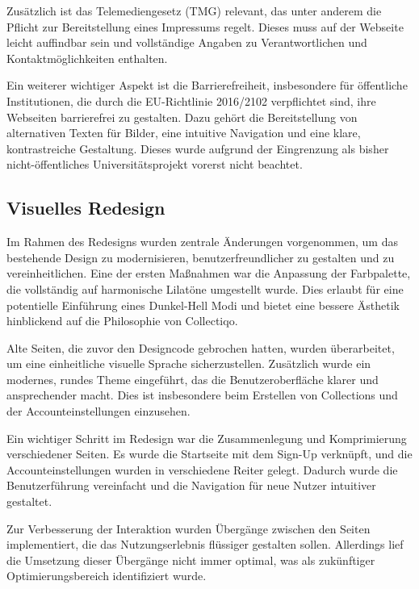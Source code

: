 Zusätzlich ist das Telemediengesetz (TMG) relevant, das unter anderem die Pflicht zur Bereitstellung eines Impressums regelt.
Dieses muss auf der Webseite leicht auffindbar sein und vollständige Angaben zu Verantwortlichen und Kontaktmöglichkeiten enthalten. \break

Ein weiterer wichtiger Aspekt ist die Barrierefreiheit, insbesondere für öffentliche Institutionen, die durch die EU-Richtlinie 2016/2102 verpflichtet sind, ihre Webseiten barrierefrei zu gestalten.
Dazu gehört die Bereitstellung von alternativen Texten für Bilder, eine intuitive Navigation und eine klare, kontrastreiche Gestaltung.
Dieses wurde aufgrund der Eingrenzung als bisher nicht-öffentliches Universitätsprojekt vorerst nicht beachtet. \break


\parencite{GIDF.2024}

\subsection{Visuelles Redesign}\label{subsec:subsection-three-two}

Im Rahmen des Redesigns wurden zentrale Änderungen vorgenommen, um das bestehende Design zu modernisieren, benutzerfreundlicher zu gestalten und zu vereinheitlichen.
Eine der ersten Maßnahmen war die Anpassung der Farbpalette, die vollständig auf harmonische Lilatöne umgestellt wurde.
Dies erlaubt für eine potentielle Einführung eines Dunkel-Hell Modi und bietet eine bessere Ästhetik hinblickend auf die Philosophie von Collectiqo. \break

Alte Seiten, die zuvor den Designcode gebrochen hatten, wurden überarbeitet, um eine einheitliche visuelle Sprache sicherzustellen.
Zusätzlich wurde ein modernes, rundes Theme eingeführt, das die Benutzeroberfläche klarer und ansprechender macht.
Dies ist insbesondere beim Erstellen von Collections und der Accounteinstellungen einzusehen. \break

Ein wichtiger Schritt im Redesign war die Zusammenlegung und Komprimierung verschiedener Seiten.
Es wurde die Startseite mit dem Sign-Up verknüpft, und die Accounteinstellungen wurden in verschiedene Reiter gelegt.
Dadurch wurde die Benutzerführung vereinfacht und die Navigation für neue Nutzer intuitiver gestaltet. \break

Zur Verbesserung der Interaktion wurden Übergänge zwischen den Seiten implementiert, die das Nutzungserlebnis flüssiger gestalten sollen.
Allerdings lief die Umsetzung dieser Übergänge nicht immer optimal, was als zukünftiger Optimierungsbereich identifiziert wurde.